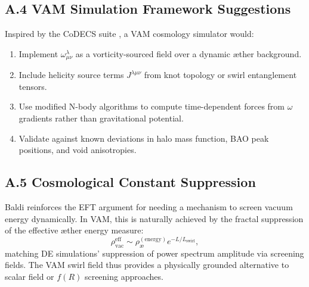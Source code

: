 \documentclass[12pt]{article}
\begin{document}
    \subsection*{A.4 VAM Simulation Framework Suggestions}
    Inspired by the CoDECS suite \cite{baldi2012codecs}, a VAM cosmology simulator would:
    \begin{enumerate}
        \item Implement $\omega^\lambda_{\mu\nu}$ as a vorticity-sourced field over a dynamic æther background.
        \item Include helicity source terms $J^{\lambda\mu\nu}$ from knot topology or swirl entanglement tensors.
        \item Use modified N-body algorithms to compute time-dependent forces from $\omega$ gradients rather than gravitational potential.
        \item Validate against known deviations in halo mass function, BAO peak positions, and void anisotropies.
    \end{enumerate}

    \subsection*{A.5 Cosmological Constant Suppression}
    Baldi reinforces the EFT argument for needing a mechanism to screen vacuum energy dynamically. In VAM, this is naturally achieved by the fractal suppression of the effective æther energy measure:
    \[
        \rho_{\text{vac}}^{\text{eff}} \sim \rho_\text{\ae}^{(\text{energy})} e^{-L / L_\text{swirl}},
    \]
    matching DE simulations' suppression of power spectrum amplitude via screening fields. The VAM swirl field thus provides a physically grounded alternative to scalar field or $f(R)$ screening approaches.



    
    
\end{document}
